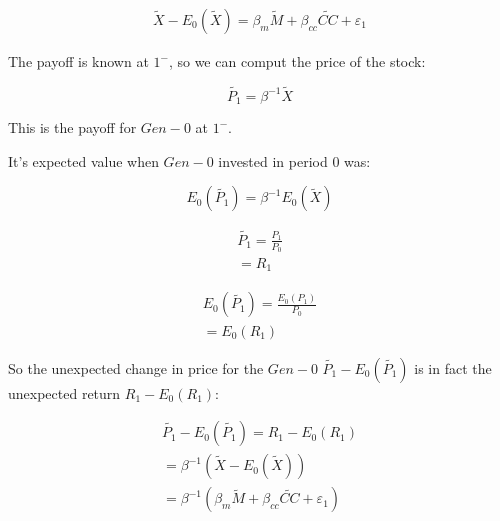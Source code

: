 \begin{equation}
    \begin{aligned}
    \tilde{X} - E_0(\tilde{X}) = \beta_m \tilde{M} + \beta_{cc} \tilde{CC} + \varepsilon_1
    \end{aligned}
\end{equation}

The payoff is known at $1^{-}$, so 
we can comput the price of the stock:

\begin{equation}
    \tilde{P_1} = \beta^{-1}\tilde{X}
\end{equation}

This is the payoff for $Gen-0$ at $1^{-}$.

It's expected value when $Gen-0$ invested in period 0 was:

\begin{equation}
    E_0(\tilde{P_1}) = \beta^{-1} E_0(\tilde{X})
\end{equation}


\begin{equation}
    \begin{aligned}
    \tilde{P_1} = \frac{P_1}{P_0} \\
    = R_1
    \end{aligned}
\end{equation}


\begin{equation}
    \begin{aligned}
    E_0(\tilde{P_1}) = \frac{E_0(P_1)}{P_0} \\
    = E_0(R_1)
    \end{aligned}
\end{equation}

So the unexpected change in price 
for the $Gen-0$ $\tilde{P_1} - E_0(\tilde{P_1})$ is in fact
the unexpected return $R_1 - E_0(R_1)$:

\begin{equation}
    \begin{aligned}
    \tilde{P_1} - E_0(\tilde{P_1}) = R_1 - E_0(R_1) \\
    = \beta^{-1} (\tilde{X} - E_0(\tilde{X})) \\
    = \beta^{-1} (\beta_m \tilde{M} + \beta_{cc} \tilde{CC} + \varepsilon_1)
    \end{aligned}
\end{equation}

